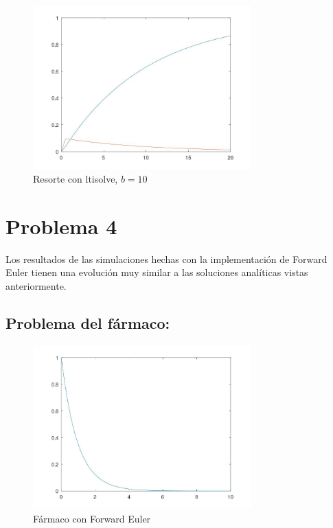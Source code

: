 \documentclass[a4paper,12pt]{article}
\begin{document}
\begin{figure}[H]
\centering
\includegraphics[width=0.75\textwidth]{img/ej3_3.jpeg}
\caption{Resorte con ltisolve, \( b = 10 \)}
\end{figure}

\section*{Problema 4}

Los resultados de las simulaciones hechas con la implementación de Forward Euler tienen una evolución muy similar a las soluciones analíticas vistas anteriormente.

\subsection*{Problema del fármaco:}

\begin{figure}[H]
\centering
\includegraphics[width=0.75\textwidth]{img/ej4_1.jpeg}
\caption{Fármaco con Forward Euler}
\end{figure}
\end{document}
